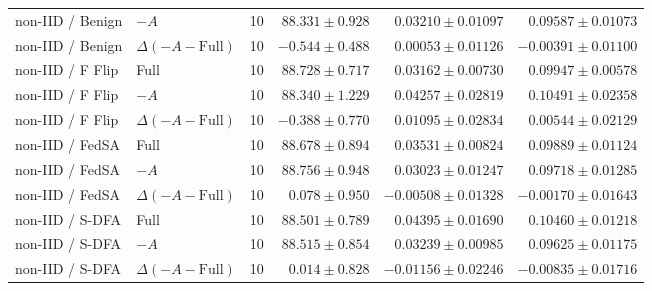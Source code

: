 \begin{table}[t]
\begin{tabular}{llrrrr}
non-IID / Benign & $-A$ & 10 & $88.331 \pm 0.928$ & $0.03210 \pm 0.01097$ & $0.09587 \pm 0.01073$ \\
non-IID / Benign & $\Delta(-A-\mathrm{Full})$ & 10 & $-0.544 \pm 0.488$ & $0.00053 \pm 0.01126$ & $-0.00391 \pm 0.01100$ \\
non-IID / F Flip & Full & 10 & $88.728 \pm 0.717$ & $0.03162 \pm 0.00730$ & $0.09947 \pm 0.00578$ \\
non-IID / F Flip & $-A$ & 10 & $88.340 \pm 1.229$ & $0.04257 \pm 0.02819$ & $0.10491 \pm 0.02358$ \\
non-IID / F Flip & $\Delta(-A-\mathrm{Full})$ & 10 & $-0.388 \pm 0.770$ & $0.01095 \pm 0.02834$ & $0.00544 \pm 0.02129$ \\
non-IID / FedSA & Full & 10 & $88.678 \pm 0.894$ & $0.03531 \pm 0.00824$ & $0.09889 \pm 0.01124$ \\
non-IID / FedSA & $-A$ & 10 & $88.756 \pm 0.948$ & $0.03023 \pm 0.01247$ & $0.09718 \pm 0.01285$ \\
non-IID / FedSA & $\Delta(-A-\mathrm{Full})$ & 10 & $0.078 \pm 0.950$ & $-0.00508 \pm 0.01328$ & $-0.00170 \pm 0.01643$ \\
non-IID / S-DFA & Full & 10 & $88.501 \pm 0.789$ & $0.04395 \pm 0.01690$ & $0.10460 \pm 0.01218$ \\
non-IID / S-DFA & $-A$ & 10 & $88.515 \pm 0.854$ & $0.03239 \pm 0.00985$ & $0.09625 \pm 0.01175$ \\
non-IID / S-DFA & $\Delta(-A-\mathrm{Full})$ & 10 & $0.014 \pm 0.828$ & $-0.01156 \pm 0.02246$ & $-0.00835 \pm 0.01716$ \\
\bottomrule
\end{tabular}
\end{table}

